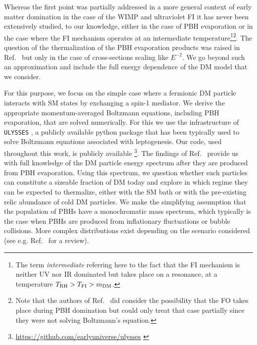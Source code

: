 \documentclass[aps,prd,reprint,twocolumn,preprintnumbers,floatfix,nofootinbib]{revtex4-1}
\begin{document}
Whereas the first point was partially addressed in a more general context of early matter domination in the case of the WIMP \cite{Arias:2019uol} and ultraviolet FI \cite{Bernal:2019mhf} it has never been extensively studied, to our knowledge,  either in the case of PBH evaporation or in the case where the FI mechanism operates at an intermediate temperature\footnote{The term {\em intermediate} referring here to the fact that the FI mechanism is neither UV nor IR dominated but takes place on a resonance, at a temperature $T_{\rm RH}> T_{\rm FI}> m_{\rm DM}$.}\footnote{Note that the authors of Ref.~\cite{Bernal:2020bjf} did consider the possibility that the FO takes place during PBH domination but could only treat that case partially since they were not solving Boltzmann's equation.}. The question of the thermalization of the PBH evaporation products was raised in Ref.~\cite{Gondolo:2020uqv} but only in the case of cross-sections scaling like $E^{-2}$. We go beyond such an approximation and include the full energy dependence of the DM model that we consider.

For this purpose, we focus on the simple case where a fermionic DM particle interacts with SM states by exchanging a spin-1 mediator. We derive the appropriate momentum-averaged Boltzmann equations, including PBH evaporation, that are solved numerically.  For this we use the infrastructure of {\tt ULYSSES} \cite{Granelli:2020pim}, a publicly available python package that has been typically used to solve Boltzmann equations associated with leptogenesis. Our code, used throughout this work, is publicly available \footnote{\url{https://github.com/earlyuniverse/ulysses} \href{https://github.com/earlyuniverse/ulysses}{\faGithub}}. The findings of Ref.~\cite{paper1} provide us with full knowledge of the DM particle energy spectrum after they are produced from PBH evaporation. Using this spectrum, we question whether such particles can constitute a sizeable fraction of DM today and explore in which regime they can be expected to thermalize, either with the SM bath or with the pre-existing relic abundance of cold DM particles. %
{We make the simplifying assumption that the population of PBHs have a
monochromatic mass spectrum, which typically is the case when PBHs are produced from inflationary fluctuations or bubble collisions. More complex distributions exist depending on the scenario considered (see e.g. Ref.~\cite{doi:10.1146/annurev-nucl-050520-125911} for a review).}
\end{document}
